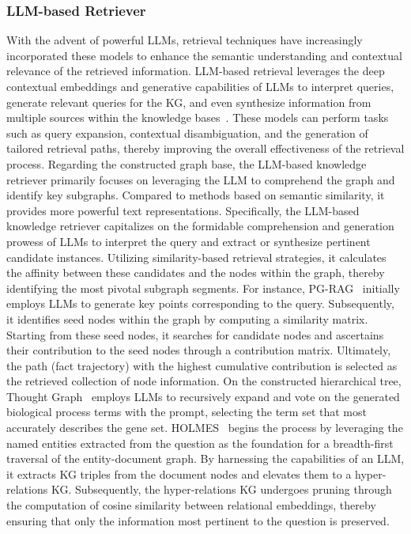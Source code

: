 \documentclass[lettersize,journal]{IEEEtran}
\begin{document}
\subsubsection{LLM-based Retriever}
With the advent of powerful LLMs, retrieval techniques have increasingly incorporated these models to enhance the semantic understanding and contextual relevance of the retrieved information. LLM-based retrieval leverages the deep contextual embeddings and generative capabilities of LLMs to interpret queries, generate relevant queries for the KG, and even synthesize information from multiple sources within the knowledge bases~\cite{sun2024thinkongraph,guo2024lightrag,ma2024think-on-graph-2.0}. These models can perform tasks such as query expansion, contextual disambiguation, and the generation of tailored retrieval paths, thereby improving the overall effectiveness of the retrieval process.
Regarding the constructed graph base, the LLM-based knowledge retriever primarily focuses on leveraging the LLM to comprehend the graph and identify key subgraphs. Compared to methods based on semantic similarity, it provides more powerful text representations. Specifically, the LLM-based knowledge retriever capitalizes on the formidable comprehension and generation prowess of LLMs to interpret the query and extract or synthesize pertinent candidate instances. Utilizing similarity-based retrieval strategies, it calculates the affinity between these candidates and the nodes within the graph, thereby identifying the most pivotal subgraph segments. For instance, PG-RAG~\cite{liang2024empowering} initially employs LLMs to generate key points corresponding to the query. Subsequently, it identifies seed nodes within the graph by computing a similarity matrix. Starting from these seed nodes, it searches for candidate nodes and ascertains their contribution to the seed nodes through a contribution matrix. Ultimately, the path (fact trajectory) with the highest cumulative contribution is selected as the retrieved collection of node information. 
On the constructed hierarchical tree, Thought Graph~\cite{hsu2024thought} employs LLMs to recursively expand and vote on the generated biological process terms with the prompt, selecting the term set that most accurately describes the gene set.
HOLMES~\cite{panda2024holmes} begins the process by leveraging the named entities extracted from the question as the foundation for a breadth-first traversal of the entity-document graph. By harnessing the capabilities of an LLM, it extracts KG triples from the document nodes and elevates them to a hyper-relations KG. Subsequently, the hyper-relations KG undergoes pruning through the computation of cosine similarity between relational embeddings, thereby ensuring that only the information most pertinent to the question is preserved.
\end{document}
